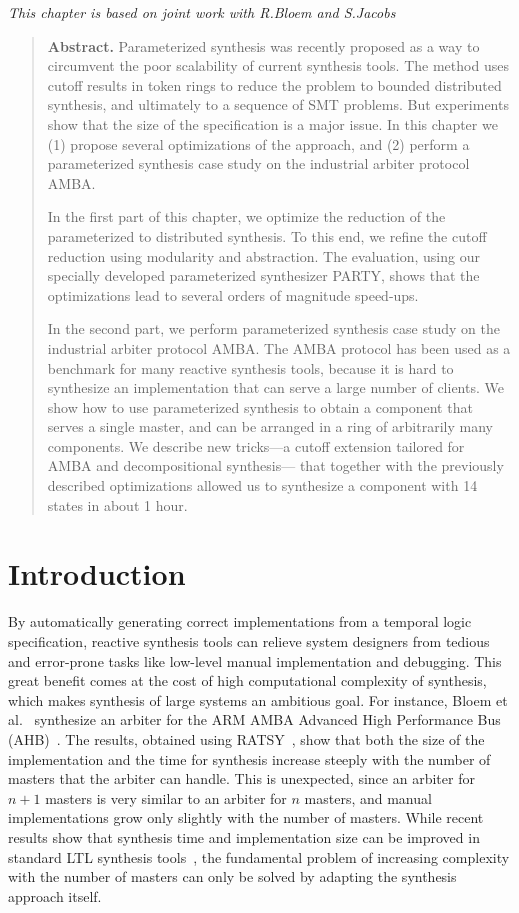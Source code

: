 \hfill {\footnotesize\textit{This chapter is based on joint work with R.Bloem and S.Jacobs~\cite{Khalimov13,party,BJK14}}~~~~~~~~}

\begin{quotation}
\noindent\textbf{Abstract.}
Parameterized synthesis was recently proposed as a way
to circumvent the poor scalability of current synthesis tools.
The method uses cutoff results in token rings to
reduce the problem to bounded distributed synthesis,
and ultimately to a sequence of SMT problems. 
But experiments show that the size of the specification is a major issue. 
In this chapter we
 (1) propose several optimizations of the approach, and
 (2) perform a parameterized synthesis case study on the industrial arbiter protocol AMBA.

In the first part of this chapter,
we optimize the reduction of the parameterized to distributed synthesis.
To this end,
we refine the cutoff reduction using modularity and abstraction.
The evaluation, using our specially developed parameterized synthesizer PARTY,
shows that the optimizations lead to several orders of magnitude speed-ups.

In the second part, we perform parameterized synthesis case study
on the industrial arbiter protocol AMBA.
The AMBA protocol has been used as a benchmark for many reactive synthesis tools,
because it is hard to synthesize an implementation that can serve a large number of clients.
We show how to use parameterized synthesis to obtain a component that serves a single master,
and can be arranged in a ring of arbitrarily many components.
We describe new tricks---a cutoff extension tailored for AMBA and decompositional synthesis---%
that together with the previously described optimizations allowed us
to synthesize a component with 14 states in about 1 hour.
\end{quotation}

\section{Introduction}

By automatically generating correct implementations from a temporal logic 
specification, reactive synthesis tools can relieve system designers from 
tedious and error-prone tasks like low-level manual implementation and 
debugging. This great benefit comes at the cost of high computational complexity 
of synthesis, which makes synthesis of large systems an ambitious goal. 
For instance, Bloem et al.~\cite{Bloem12}
synthesize an arbiter for the ARM AMBA Advanced High
Performance Bus (AHB)~\cite{AMBAspec}. The results, obtained using 
RATSY~\cite{Bloem10c},
show that both the size of the implementation and the time for synthesis
increase steeply with the number of masters that the arbiter can
handle. This is unexpected, since an arbiter for $n+1$ masters is very 
similar to an arbiter for $n$ masters, and manual implementations grow only 
slightly with the number of masters. While recent results show that 
synthesis time and implementation size can be improved in standard LTL 
synthesis tools~\cite{BS,GodhalCH13}, the fundamental problem of increasing 
complexity with the number of masters can only be solved by adapting the 
synthesis approach itself.


